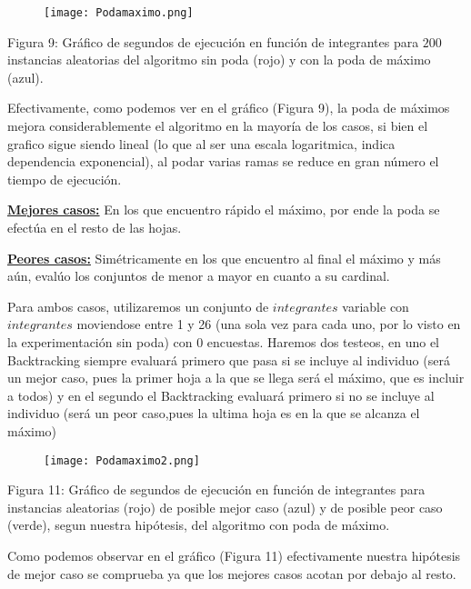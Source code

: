 \documentclass[A4paper,oneside,fleqn,10pt]{article}
\theoremstyle{definition}
\begin{document}
\clearpage

\begin{figure}[!ht]
  \texttt{[image: Podamaximo.png]}
 \label{fig:boat8}
\end{figure}

\scriptsize
	Figura 9: Gráfico de segundos de ejecución en función de integrantes para $200$ instancias aleatorias del algoritmo sin poda (rojo) y con la poda de máximo (azul).
  
  \normalsize

Efectivamente, como podemos ver en el gráfico (Figura 9), la poda de máximos mejora considerablemente el algoritmo en la mayoría de los casos, si bien el grafico sigue siendo lineal (lo que al ser una escala logaritmica, indica dependencia exponencial), al podar varias ramas se reduce en gran número el tiempo de ejecución.  

\underline{\textbf{Mejores casos:}} En los que encuentro rápido el máximo, por ende la poda se efectúa en el resto de las hojas.

\underline{\textbf{Peores casos:}} Simétricamente en los que encuentro al final el máximo y más aún, evalúo los conjuntos de menor a mayor en cuanto a su cardinal.

Para ambos casos, utilizaremos un conjunto de $integrantes$ variable con $integrantes$ moviendose entre 1 y 26 (una sola vez para cada uno, por lo visto en la experimentación sin poda) con 0 encuestas. Haremos dos testeos, en uno el Backtracking siempre evaluará primero que pasa si se incluye al individuo (será un mejor caso, pues la primer hoja a la que se llega será el máximo, que es incluir a todos) y en el segundo el Backtracking evaluará primero si no se incluye al individuo (será un peor caso,pues la ultima hoja es en la que se alcanza el máximo)

\begin{figure}[!ht]
  \texttt{[image: Podamaximo2.png]}
    \label{fig:boat10}
\end{figure}

\scriptsize

 Figura 11: Gráfico de segundos de ejecución en función de integrantes para instancias aleatorias (rojo) de posible mejor caso (azul) y de posible peor caso (verde), segun nuestra hipótesis, del algoritmo con poda de máximo.
\normalsize

Como podemos observar en el gráfico (Figura 11) efectivamente nuestra hipótesis de mejor caso se comprueba ya que los mejores casos acotan por debajo al resto.
\end{document}
